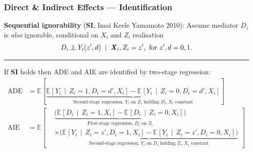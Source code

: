 \documentclass[dvipsnames,handout]{beamer} %
\renewcommand{\vec}[1]{\boldsymbol{\mathit{#1}}}                           %
\newcommand{\E}[2][]{\mathbb{E}_{#1} \left[ #2 \right]}                    %
\newcommand{\Egiven}[3][]{\mathbb{E}_{#1} \left[ #2 \, \middle\vert \, #3 \right]} %
\newcommand{\indep}{\, \raisebox{0.05em}{\rotatebox[origin=c]{90}{$\models$}} \,}%
\begin{document}
\begin{frame}
    \frametitle{Direct \& Indirect Effects --- Identification} 
    \textbf{Sequential ignorability} (\textbf{SI}, Imai Keele Yamamoto 2010):
    \vskip0.125cm
    Assume mediator $D_i$ is \textit{also} ignorable, conditional on $\vec X_i$ and $Z_i$ realisation
    \[ D_i \indep Y_i(z', d) \;\; | \;\; \vec X_i, Z_i = z',
    \text{ for } z', d = 0, 1. \]
    \par\noindent\rule{\textwidth}{0.4pt}
    \pause
    If \textbf{SI} holds then ADE and AIE are identified by two-stage regression:
    \begin{align*}
        \text{ADE} &= \E{
            \underbrace{\Egiven{Y_i}{Z_i = 1, D_i = d', \vec X_i} - \Egiven{Y_i}{Z_i = 0, D_i = d', \vec X_i}}_{\text{Second-stage regression, $Y_i$ on $Z_i$ holding $D_i, \vec X_i$ constant}}} \\
        \text{AIE} &= \E{
            \begin{aligned}
                & \underbrace{\Big(\Egiven{D_i}{Z_i = 1, \vec X_i} - \Egiven{D_i}{Z_i = 0, \vec X_i} \Big)}_{\text{First-stage regression, $D_i$ on $Z_i$}} \\
                & \times \underbrace{\Big(
                    \Egiven{Y_i}{Z_i = z', D_i = 1, \vec X_i} - \Egiven{Y_i}{Z_i = z', D_i = 0, \vec X_i} \Big)}_{\text{Second-stage regression, $Y_i$ on $D_i$ holding $Z_i, \vec X_i$ constant}}
            \end{aligned}}
    \end{align*}
\end{frame}
\end{document}

